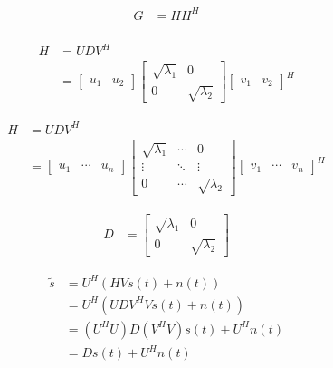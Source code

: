 \documentclass{ltjsarticle}
\begin{document}
\begin{align*}
  G &= HH^H\\
\end{align*}

\begin{align*}
  H &= UDV^H\\
    &=
    \begin{bmatrix}
      u_1 & u_2
    \end{bmatrix}
    \begin{bmatrix}
      \sqrt{\lambda_1} & 0\\
      0 & \sqrt{\lambda_2}
    \end{bmatrix}
    \begin{bmatrix}
      v_1 & v_2
    \end{bmatrix}^H
\end{align*}

\begin{align*}
  H &= UDV^H\\
    &=
    \begin{bmatrix}
      u_1 & \cdots & u_n
    \end{bmatrix}
    \begin{bmatrix}
      \sqrt{\lambda_1} & \cdots & 0\\
      \vdots & \ddots & \vdots \\
      0 & \cdots & \sqrt{\lambda_2}
    \end{bmatrix}
    \begin{bmatrix}
      v_1 & \cdots & v_n
    \end{bmatrix}^H
\end{align*}

\begin{align*}
  D &=
  \begin{bmatrix}
    \sqrt{\lambda_1} & 0\\
    0 & \sqrt{\lambda_2}
  \end{bmatrix}
\end{align*}

\begin{align*}
  \tilde{s} &= U^H(HVs(t) + n(t))\\
        &= U^H(UDV^HVs(t) + n(t))\\
        &= (U^HU)D(V^HV)s(t) + U^Hn(t)\\
        &= Ds(t) + U^Hn(t)
\end{align*}
\end{document}
